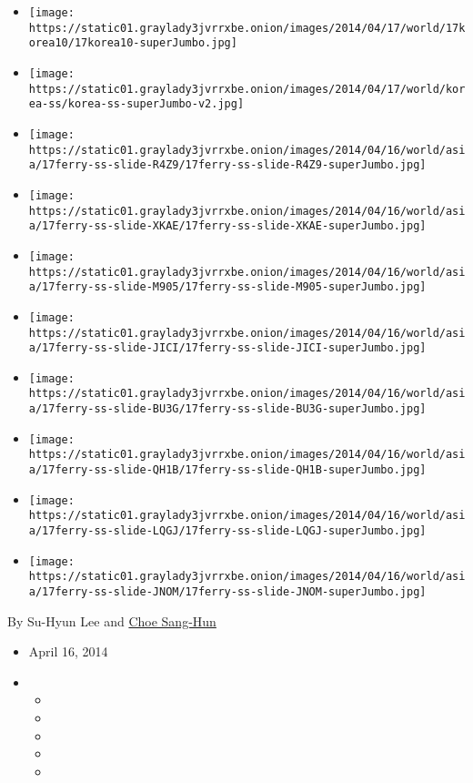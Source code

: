 \begin{itemize}
\item
  \texttt{[image: https://static01.graylady3jvrrxbe.onion/images/2014/04/17/world/17korea10/17korea10-superJumbo.jpg]}
\item
  \texttt{[image: https://static01.graylady3jvrrxbe.onion/images/2014/04/17/world/korea-ss/korea-ss-superJumbo-v2.jpg]}
\item
  \texttt{[image: https://static01.graylady3jvrrxbe.onion/images/2014/04/16/world/asia/17ferry-ss-slide-R4Z9/17ferry-ss-slide-R4Z9-superJumbo.jpg]}
\item
  \texttt{[image: https://static01.graylady3jvrrxbe.onion/images/2014/04/16/world/asia/17ferry-ss-slide-XKAE/17ferry-ss-slide-XKAE-superJumbo.jpg]}
\item
  \texttt{[image: https://static01.graylady3jvrrxbe.onion/images/2014/04/16/world/asia/17ferry-ss-slide-M905/17ferry-ss-slide-M905-superJumbo.jpg]}
\item
  \texttt{[image: https://static01.graylady3jvrrxbe.onion/images/2014/04/16/world/asia/17ferry-ss-slide-JICI/17ferry-ss-slide-JICI-superJumbo.jpg]}
\item
  \texttt{[image: https://static01.graylady3jvrrxbe.onion/images/2014/04/16/world/asia/17ferry-ss-slide-BU3G/17ferry-ss-slide-BU3G-superJumbo.jpg]}
\item
  \texttt{[image: https://static01.graylady3jvrrxbe.onion/images/2014/04/16/world/asia/17ferry-ss-slide-QH1B/17ferry-ss-slide-QH1B-superJumbo.jpg]}
\item
  \texttt{[image: https://static01.graylady3jvrrxbe.onion/images/2014/04/16/world/asia/17ferry-ss-slide-LQGJ/17ferry-ss-slide-LQGJ-superJumbo.jpg]}
\item
  \texttt{[image: https://static01.graylady3jvrrxbe.onion/images/2014/04/16/world/asia/17ferry-ss-slide-JNOM/17ferry-ss-slide-JNOM-superJumbo.jpg]}
\end{itemize}

By Su-Hyun Lee and
\href{http://www.nytimes3xbfgragh.onion/by/choe-sang-hun}{Choe Sang-Hun}

\begin{itemize}
\item
  April 16, 2014
\item
  \begin{itemize}
  \item
  \item
  \item
  \item
  \item
  \end{itemize}
\end{itemize}

